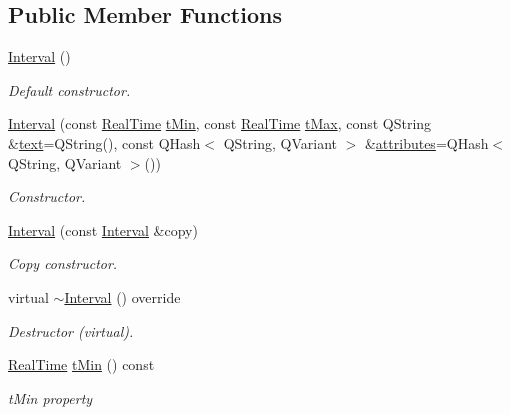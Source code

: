 \subsection*{Public Member Functions}
\begin{DoxyCompactItemize}
\item 
\mbox{\label{class_interval_a115ec019acb96b75bd872cbb871f54e5}} 
\hyperlink{class_interval_a115ec019acb96b75bd872cbb871f54e5}{Interval} ()
\begin{DoxyCompactList}\small\item\em Default constructor. \end{DoxyCompactList}\item 
\hyperlink{class_interval_a2a823516ca46649463bb83f046093ba1}{Interval} (const \hyperlink{struct_real_time}{Real\+Time} \hyperlink{class_interval_aba4daaa96ab1085b72cf19c896401593}{t\+Min}, const \hyperlink{struct_real_time}{Real\+Time} \hyperlink{class_interval_ab9efa1b25d5e4997d99ad0f360c7b2d7}{t\+Max}, const Q\+String \&\hyperlink{class_annotation_element_aa59bd98501e3882990681f6aff2ee863}{text}=Q\+String(), const Q\+Hash$<$ Q\+String, Q\+Variant $>$ \&\hyperlink{class_annotation_element_a58082d92f50c4fde2d18ce24ef3fd283}{attributes}=Q\+Hash$<$ Q\+String, Q\+Variant $>$())
\begin{DoxyCompactList}\small\item\em Constructor. \end{DoxyCompactList}\item 
\hyperlink{class_interval_a41ac30b52ead595e870fde9c8c18e0e3}{Interval} (const \hyperlink{class_interval}{Interval} \&copy)
\begin{DoxyCompactList}\small\item\em Copy constructor. \end{DoxyCompactList}\item 
\mbox{\label{class_interval_addc606ef4606aaee647b3b68086017fa}} 
virtual \hyperlink{class_interval_addc606ef4606aaee647b3b68086017fa}{$\sim$\+Interval} () override
\begin{DoxyCompactList}\small\item\em Destructor (virtual). \end{DoxyCompactList}\item 
\hyperlink{struct_real_time}{Real\+Time} \hyperlink{class_interval_aba4daaa96ab1085b72cf19c896401593}{t\+Min} () const
\begin{DoxyCompactList}\small\item\em t\+Min property \end{DoxyCompactList}\item 

\end{DoxyCompactItemize}
